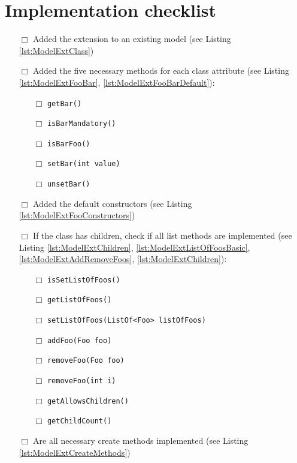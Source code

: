 \section{Implementation checklist}
    \begin{itemize}
        \item [$\Box$] Added the extension to an existing model (see Listing \ref{lst:ModelExtClass})
        \item [$\Box$] Added the five necessary methods for each class attribute (see Listing \ref{lst:ModelExtFooBar}, \ref{lst:ModelExtFooBarDefault}):
            \begin{itemize}
              \item [$\Box$] \texttt{getBar()}
              \item [$\Box$] \texttt{isBarMandatory()}
              \item [$\Box$] \texttt{isBarFoo()}
              \item [$\Box$] \texttt{setBar(int value)}
              \item [$\Box$] \texttt{unsetBar()}
            \end{itemize}
        \item [$\Box$] Added the default constructors (see Listing \ref{lst:ModelExtFooConstructors})
        \item [$\Box$] If the class has children, check if all list methods are implemented (see Listing \ref{lst:ModelExtChildren}, \ref{lst:ModelExtListOfFoosBasic}, \ref{lst:ModelExtAddRemoveFoos}, \ref{lst:ModelExtChildren}):
            \begin{itemize}
              \item [$\Box$] \texttt{isSetListOfFoos()}
              \item [$\Box$] \texttt{getListOfFoos()}
              \item [$\Box$] \texttt{setListOfFoos(ListOf<Foo> listOfFoos)}
              \item [$\Box$] \texttt{addFoo(Foo foo)}
              \item [$\Box$] \texttt{removeFoo(Foo foo)}
              \item [$\Box$] \texttt{removeFoo(int i)}
              \item [$\Box$] \texttt{getAllowsChildren()}
              \item [$\Box$] \texttt{getChildCount()}
            \end{itemize}
        \item [$\Box$] Are all necessary create methods implemented (see Listing \ref{lst:ModelExtCreateMethods})

\end{itemize}
